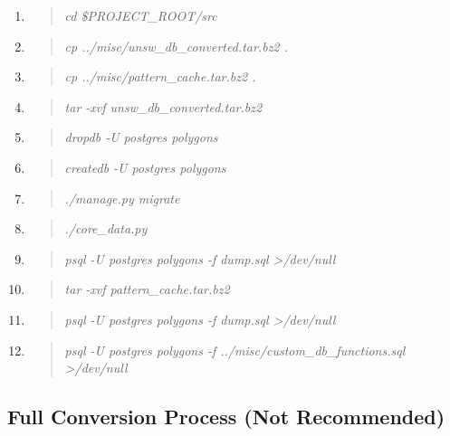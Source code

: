 \documentclass[12pt]{article}
\newenvironment{command}
   { 
      \begin{quote}\itshape
      \color{blue}
   }
   { \end{quote} }
\begin{document}
\begin{enumerate}
   \item \begin{command} cd \$PROJECT\_ROOT/src \end{command}
   \item \begin{command} cp ../misc/unsw\_db\_converted.tar.bz2 . \end{command}
   \item \begin{command} cp ../misc/pattern\_cache.tar.bz2 . \end{command}
   \item \begin{command} tar -xvf unsw\_db\_converted.tar.bz2 \end{command}
   \item \begin{command} dropdb -U postgres polygons \end{command}
   \item \begin{command} createdb -U postgres polygons \end{command}
   \item \begin{command} ./manage.py migrate \end{command}
   \item \begin{command} ./core\_data.py \end{command}
   \item \begin{command} psql -U postgres polygons -f dump.sql >/dev/null \end{command}
   \item \begin{command} tar -xvf pattern\_cache.tar.bz2 \end{command}
   \item \begin{command} psql -U postgres polygons -f dump.sql >/dev/null \end{command}
   \item \begin{command} psql -U postgres polygons -f ../misc/custom\_db\_functions.sql >/dev/null \end{command}
\end{enumerate}

\subsection{Full Conversion Process (Not Recommended)}
\end{document}
